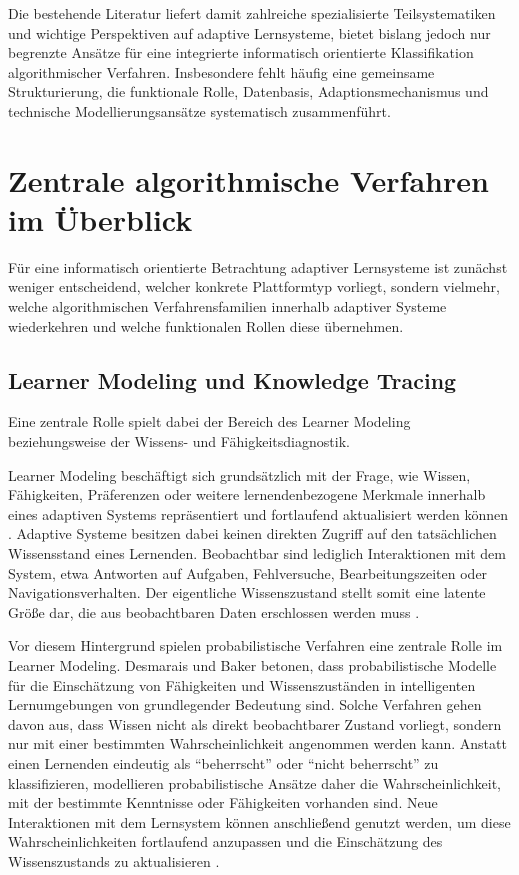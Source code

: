 Die bestehende Literatur liefert damit zahlreiche spezialisierte
Teilsystematiken und wichtige Perspektiven auf adaptive Lernsysteme,
bietet bislang jedoch nur begrenzte Ansätze für eine integrierte
informatisch orientierte Klassifikation algorithmischer Verfahren.
Insbesondere fehlt häufig eine gemeinsame Strukturierung, die
funktionale Rolle, Datenbasis, Adaptionsmechanismus und technische
Modellierungsansätze systematisch zusammenführt.

\section{Zentrale algorithmische Verfahren im
Überblick}\label{zentrale-algorithmische-verfahren-im-uxfcberblick}

Für eine informatisch orientierte Betrachtung adaptiver Lernsysteme ist
zunächst weniger entscheidend, welcher konkrete Plattformtyp vorliegt,
sondern vielmehr, welche algorithmischen Verfahrensfamilien innerhalb
adaptiver Systeme wiederkehren und welche funktionalen Rollen diese
übernehmen.

\subsection{Learner Modeling und Knowledge
Tracing}\label{learner-modeling-und-knowledge-tracing}

Eine zentrale Rolle spielt dabei der Bereich des Learner Modeling
beziehungsweise der Wissens- und Fähigkeitsdiagnostik.

Learner Modeling beschäftigt sich grundsätzlich mit der Frage, wie
Wissen, Fähigkeiten, Präferenzen oder weitere lernendenbezogene Merkmale
innerhalb eines adaptiven Systems repräsentiert und fortlaufend
aktualisiert werden können \citep{Wang2025, Boeck2025}. Adaptive Systeme
besitzen dabei keinen direkten Zugriff auf den tatsächlichen
Wissensstand eines Lernenden. Beobachtbar sind lediglich Interaktionen
mit dem System, etwa Antworten auf Aufgaben, Fehlversuche,
Bearbeitungszeiten oder Navigationsverhalten. Der eigentliche
Wissenszustand stellt somit eine latente Größe dar, die aus
beobachtbaren Daten erschlossen werden muss \citep{Desmarais2012}.

Vor diesem Hintergrund spielen probabilistische Verfahren eine zentrale
Rolle im Learner Modeling. Desmarais und Baker betonen, dass
probabilistische Modelle für die Einschätzung von Fähigkeiten und
Wissenszuständen in intelligenten Lernumgebungen von grundlegender
Bedeutung sind. Solche Verfahren gehen davon aus, dass Wissen nicht als
direkt beobachtbarer Zustand vorliegt, sondern nur mit einer bestimmten
Wahrscheinlichkeit angenommen werden kann. Anstatt einen Lernenden
eindeutig als \enquote{beherrscht} oder \enquote{nicht beherrscht} zu
klassifizieren, modellieren probabilistische Ansätze daher die
Wahrscheinlichkeit, mit der bestimmte Kenntnisse oder Fähigkeiten
vorhanden sind. Neue Interaktionen mit dem Lernsystem können
anschließend genutzt werden, um diese Wahrscheinlichkeiten fortlaufend
anzupassen und die Einschätzung des Wissenszustands zu aktualisieren
\citep{Desmarais2012}.

